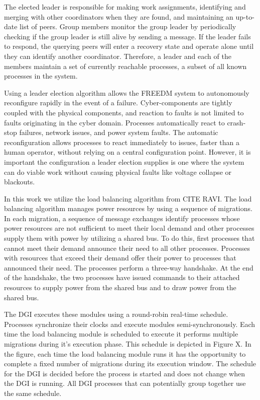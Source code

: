 The elected leader is responsible for making work assignments, identifying and merging with other coordinators when they are found, and maintaining an up-to-date list of peers.
Group members monitor the group leader by periodically checking if the group leader is still alive by sending a message.
If the leader fails to respond, the querying peers will enter a recovery state and operate alone until they can identify another coordinator.
Therefore, a leader and each of the members maintain a set of currently reachable processes, a subset of all known processes in the system.

Using a leader election algorithm allows the FREEDM system to autonomously reconfigure rapidly in the event of a failure.
Cyber-components are tightly coupled with the physical components, and reaction to faults is not limited to faults originating in the cyber domain.
Processes automatically react to crash-stop failures, network issues, and power system faults.
The automatic reconfiguration allows processes to react immediately to issues, faster than a human operator, without relying on a central configuration point.
However, it is important the configuration a leader election supplies is one where the system can do viable work without causing physical faults like voltage collapse or blackouts\cite{HARINI}.

In this work we utilize the load balancing algorithm from CITE RAVI.
The load balancing algorithm manages power resources by using a sequence of migrations.
In each migration, a sequence of message exchanges identify processes whose power resources are not sufficient to meet their local demand and other processes supply them with power by utilizing a shared bus.
To do this, first processes that cannot meet their demand announce their need to all other processes.
Processes with resources that exceed their demand offer their power to processes that announced their need.
The processes perform a three-way handshake.
At the end of the handshake, the two processes have issued commands to their attached resources to supply power from the shared bus and to draw power from the shared bus.

The DGI executes these modules using a round-robin real-time schedule.
Processes synchronize their clocks and execute modules semi-synchronously.
Each time the load balancing module is scheduled to execute it performs multiple migrations during it's execution phase.
This schedule is depicted in Figure X.
In the figure, each time the load balancing module runs it has the opportunity to complete a fixed number of migrations during its execution window.
The schedule for the DGI is decided before the process is started and does not change when the DGI is running.
All DGI processes that can potentially group together use the same schedule.

